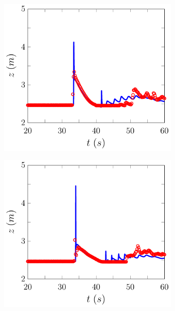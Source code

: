 \begin{figure}
\begin{subfigure}{0.5\textwidth}
		\vspace{0.5cm}
	\end{subfigure}
	\begin{subfigure}{0.5\textwidth}
		\includegraphics[width=\textwidth]{./chp6/figures/Experiment/Roeber/Trial8/FEVM/WG9-figure0.pdf}
		\vspace{0.5cm}
	\end{subfigure}%
	\begin{subfigure}{0.5\textwidth}
		\includegraphics[width=\textwidth]{./chp6/figures/Experiment/Roeber/Trial8/FEVM/WG10-figure0.pdf}

\end{subfigure}
\end{figure}
